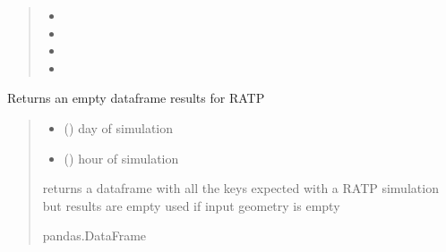\documentclass[letterpaper,10pt,english]{sphinxmanual}
\begin{document}
\begin{quote}
\begin{itemize}
\item {} 
\sphinxAtStartPar
{}

\item {} 
\sphinxAtStartPar
{}

\item {} 
\sphinxAtStartPar
{}

\item {} 
\sphinxAtStartPar
{}

\end{itemize}
\end{quote}

\begin{fulllineitems}
\label{\detokenize{reference:outputs.out_ratp_empty_grid}}
\pysigstartsignatures
{}
\pysigstopsignatures
\sphinxAtStartPar
Returns an empty dataframe results for RATP
\begin{quote}\begin{description}
\begin{itemize}
\item {} 
\sphinxAtStartPar
{} () \textendash{} day of simulation

\item {} 
\sphinxAtStartPar
{} () \textendash{} hour of simulation

\end{itemize}

\sphinxAtStartPar
returns a dataframe with all the keys expected with a RATP simulation but results are empty
used if input geometry is empty

\sphinxAtStartPar
pandas.DataFrame

\end{description}\end{quote}

\end{fulllineitems}
\end{document}
